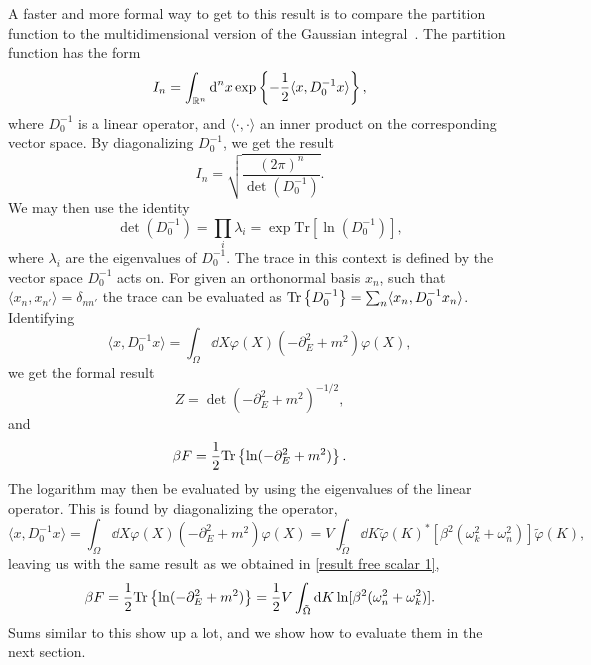 A faster and more formal way to get to this result is to compare the partition function to the multidimensional version of the Gaussian integral~\autocite{kapustaFiniteTemperatureFieldTheory2006,peskinIntroductionQuantumField1995}.
The partition function has the form 
\begin{equation*}
    I_n = \int_{\mathbb{R}^n} \text{d}^n x\, \text{exp} \left\{ - \frac{1}{2} \langle x, D_0^{-1} x\rangle  \right\},
\end{equation*}
where $D_0^{-1}$ is a linear operator, and $\langle \cdot , \cdot \rangle$ an inner product on the corresponding vector space.
By diagonalizing $D_0^{-1}$, we get the result
\begin{equation*}
    I_n = \sqrt{\frac{(2 \pi)^n}{\det(D_0^{-1})}}.
\end{equation*}
We may then use the identity
%
\begin{equation}
    \label{lndettrln}
    \det(D_0^{-1}) = \prod_i \lambda_i = \exp{\text{Tr}[\ln(D_0^{-1})]},
\end{equation}
%
where $\lambda_i$ are the eigenvalues of $D_0^{-1}$.
The trace in this context is defined by the vector space $D_0^{-1}$ acts on.
For given an orthonormal basis $x_n$, such that $\langle x_n, x_{n'}\rangle = \delta_{nn'}$ the trace can be evaluated as $\text{Tr} \left\{ D_0^{-1} \right\} = \sum_n \langle x_n, D_0^{-1} x_n \rangle$.
Identifying 
\begin{equation*}
    \langle x, D_0^{-1} x\rangle = \int_\Omega \dd X \varphi(X)\left(-\partial_E^2+m^2\right)\varphi(X),
\end{equation*}
we get the formal result
\begin{equation*}
    Z = \det(-\partial_E^2 + m^2)^{-1/2},
\end{equation*}
and 
\begin{equation*}
    \beta F = \frac{1}{2}\text{Tr} \left\{ \ln(-\partial_E^2 + m^2) \right\}.
\end{equation*}
The logarithm may then be evaluated by using the eigenvalues of the linear operator.
This is found by diagonalizing the operator,
\begin{equation*}
    \langle x, D_0^{-1} x \rangle 
    = \int_\Omega \dd X \varphi(X)\left(-\partial_E^2+m^2\right)\varphi(X)
    = V  \int_{\tilde \Omega} \dd K 
    \tilde \varphi(K)^* [\beta^2(\omega_k^2 +\omega_n^2)] \tilde \varphi(K),
\end{equation*}
leaving us with the same result as we obtained in 
\autoref{result free scalar 1},
\begin{equation*}
    \beta F 
    = \frac{1}{2} \text{Tr} \left\{ \ln(-\partial_E^2 + m^2) \right\} 
    = \frac{1}{2} V \int_{\tilde \Omega} \text{d} K \ln[\beta^2(\omega_n^2 + \omega_k^2)].
\end{equation*}
Sums similar to this show up a lot, and we show how to evaluate them in the next section.
